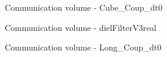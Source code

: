 \begin{figure}[H]
    \centering
    \caption{Communication volume - Cube\_Coup\_dt0}
    \label{fig:Cube_Coup_dt0_commload_single_defq}
\end{figure}

\begin{figure}[H]
    \centering
    \caption{Communication volume - dielFilterV3real}
    \label{fig:dielFilterV3real_commload_single_defq}
\end{figure}

\begin{figure}[H]
    \centering
    \caption{Communication volume - Long\_Coup\_dt0}
    \label{fig:Long_Coup_dt0_commload_single_defq}
\end{figure}
